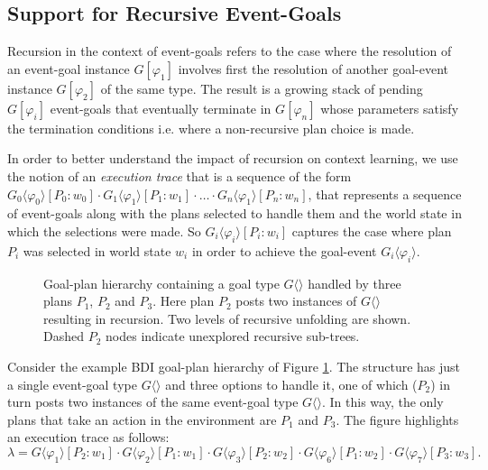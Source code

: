 \subsection{Support for Recursive Event-Goals}

Recursion in the context of event-goals refers to the case where the resolution of an event-goal instance $G[\varphi_1]$ involves first the resolution of another goal-event instance $G[\varphi_2]$ of the same type. The result is a growing stack of pending $G[\varphi_i]$ event-goals that eventually terminate in $G[\varphi_n]$ whose parameters satisfy the termination conditions i.e. where a non-recursive plan choice is made.

In order to better understand the impact of recursion on context learning, we use the notion of an \textit{execution trace} that is a sequence of the form $G_0\langle\varphi_0\rangle[P_0:w_0] \cdot G_1\langle\varphi_1\rangle[P_1:w_1] \cdot \ldots \cdot G_n\langle\varphi_1\rangle[P_n:w_n]$, that represents a sequence of event-goals along with the plans selected to handle them and the world state in which the selections were made. So $G_i\langle\varphi_i\rangle[P_i:w_i]$ captures the case where plan $P_i$ was selected in world state $w_i$ in order to achieve the goal-event $G_i\langle\varphi_i\rangle$.

\begin{figure}[t]
\begin{center}
\resizebox{0.8\textwidth}{!}{

}
\end{center}
\caption{Goal-plan hierarchy containing a goal type $G\langle\rangle$ handled by three plans $P_1$, $P_2$ and $P_3$. Here plan $P_2$ posts two instances of $G\langle\rangle$ resulting in recursion. Two levels of recursive unfolding are shown. Dashed $P_2$ nodes indicate unexplored recursive sub-trees.}
\label{fig:unfolding}
\end{figure}

Consider the example BDI goal-plan hierarchy of Figure \ref{fig:unfolding}. The structure has just a single event-goal type $G\langle\rangle$ and three options to handle it, one of which ($P_2$) in turn posts two instances of the same event-goal type $G\langle\rangle$. In this way, the only plans that take an action in the environment are $P_1$ and $P_3$. The figure highlights an execution trace as follows: \[
\lambda=G\langle\varphi_1\rangle[P_2:w_1] \cdot G\langle\varphi_2\rangle[P_1:w_1] \cdot G\langle\varphi_3\rangle[P_2:w_2] \cdot G\langle\varphi_6\rangle[P_1:w_2] \cdot G\langle\varphi_7\rangle[P_3:w_3].
\]

